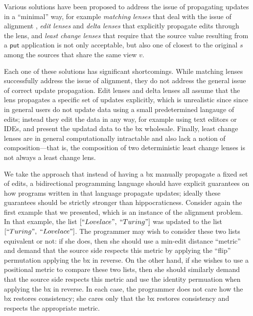 \documentclass[acmsmall,review,anonymous]{acmart}\settopmatter{printfolios=true,printccs=false,printacmref=false}
\theoremstyle{definition}
\newcommand{\kw}[1]{\ensuremath{\mathsf{#1}}\xspace}
\newcommand{\pput}{\ensuremath{\kw{put}}\xspace}
\begin{document}
Various solutions have been proposed to address the issue of propagating updates in a ``minimal'' way, for example {\em matching lenses} that deal with the issue of alignment \cite{barbosa2010matching}, {\em edit lenses} \cite{hofmann2012edit} and {\em delta lenses} \cite{diskin2011asymmetric,diskin2011state,pacheco2012delta}
that explicitly propagate edits through the lens, and {\em least change
lenses} \cite{macedo2013composing} that require that the source value resulting from a \pput application is not only acceptable, but also one of closest to the original $s$ among the sources that share the same view $v$.

Each one of these solutions has significant shortcomings. While matching lenses successfully address the issue of alignment, they do not address the general issue of correct update propagation. Edit lenses and delta lenses all assume that the lens propagates a specific set of updates explicitly, which is unrealistic since since in general users do not update data using a small predetermined langauge of edits; instead they edit the data in any way, for example using text editors or IDEs, and present the updatad data to the bx wholesale. Finally, least change lenses are in general computationally intractable \cite{buneman2002propagation} and also lack a notion of composition---that is, the composition of two deterministic least change lenses is not always a least change lens\cite{macedo2013composing}.

We take the approach that instead of having a bx manually propagate a fixed set of edits, a bidirectional programming language should have explicit guarantees on how programs written in that language propagate updates; ideally these guarantees should be strictly stronger than hippocraticness. Consider again the first example that we presented, which is an instance of the alignment problem. In that example, the list
$[``Lovelace", \; ``Turing"]$ was updated to the list $[``Turing", \; ``Lovelace"]$. The programmer may wish to consider these two lists equivalent or not: if she does, then she should use a min-edit distance ``metric'' and demand that the source side respects this metric by applying the ``flip'' permutation applying the bx in reverse. On the other hand, if she wishes to use a positional metric to compare these two lists, then she should similarly demand that the source side respects this metric and use the identity permuation when applying the bx in reverse. In each case, the programmer does not care how the bx restores consistency; she cares only that the bx restores consistency and respects the appropriate metric.
\end{document}
